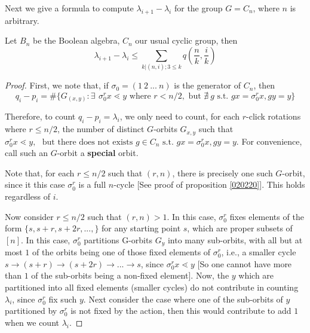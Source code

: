 \documentclass[12pt]{article}
\newcommand{\1}{\mathbb{I}}
\newcommand{\ra}{\rightarrow}
\theoremstyle{definition}
\theoremstyle{definition}
\theoremstyle{definition}
\theoremstyle{definition}
\theoremstyle{definition}
\theoremstyle{definition}
\begin{document}
Next we give a formula to compute $\lambda_{i+1} - \lambda_{i}$ for the group $G = C_n$, where $n$ is arbitrary. 

\proposition Let $B_n$ be the Boolean algebra, $C_n$ our usual cyclic group, then $$\lambda_{i+1} - \lambda_i \le \sum_{k | (n , i);  3 \le k } q (\frac{n}{k}, \frac{i}{k}) $$

\begin{proof}

First, we note that, if $\sigma_0 = (1 \: 2 \: ... \: n)$ is the generator of $C_n$, then
 $$q_i - p_i = \#\{G_{(x,y)} : \exists \: \, \sigma_0^r x \lessdot y \text{ where } r < n/2, \text{ but } \nexists \:  g \text{ s.t. } g x = \sigma_0 ^r x, g y = y \}$$ 

Therefore, to count $q_i - p_i = \lambda_i $, we only need to count, for each $r$-click rotations where $r \le n/2$, the number of distinct $G$-orbits $G_{x, y}$ such that $ \sigma_0^r x \lessdot y, \, \, \text{ but  there does not exists } g \in C_n \text{ s.t. } g x = \sigma_0 ^r x, g y = y$. For convenience, call such an $G$-orbit a \textbf{special} orbit.  

Note that, for each $r \le n/2$ such that $(r, n)$, there is precisely one such $G$-orbit, since it this case $\sigma_0^r$ is a full $n$-cycle [See proof of proposition \ref{020220}]. This holds regardless of $i$. 

Now consider $r \le n/2$ such that $(r, n) > 1$. In this case, $\sigma_0^r$ fixes elements of the form $\{s, s+r, s+2r, ..., \}$ for any starting point $s$, which are proper subsets of $[n]$. In this case, $\sigma_0^r$ partitions G-orbits $G_y$ into many sub-orbits, with all but at most $1$ of the orbits being one of those fixed elements of $\sigma_0^r$, i.e., a smaller cycle $s \ra (s+r) \ra (s+2r) \ra ... \ra s$, since $\sigma_0^r x \lessdot y$ [So one cannot have more than $1$ of the sub-orbits being a non-fixed element]. Now, the $y$ which are partitioned into all fixed elements (smaller cycles) do not contribute in counting $\lambda_i$, since $\sigma_0^r$ fix such $y$. Next consider the case where one of the sub-orbits of $y$ partitioned by $\sigma_0^r$ is not fixed by the action, then this would contribute to add $1$ when we count $\lambda_i$. 


\end{proof}
\end{document}
